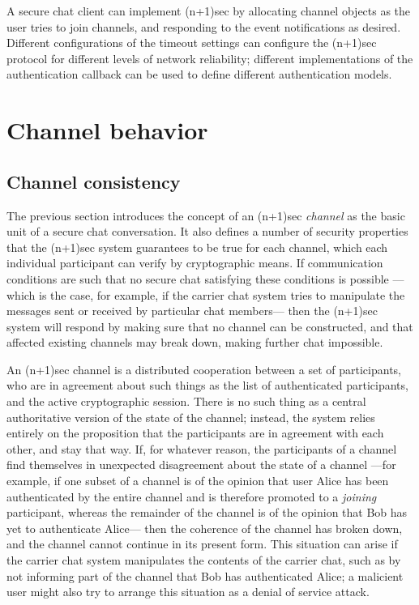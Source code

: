 \documentclass{article}
\begin{document}
A secure chat client can implement (n+1)sec by allocating channel objects as the user tries to join channels, and responding to the event notifications as desired.
Different configurations of the timeout settings can configure the (n+1)sec protocol for different levels of network reliability; different implementations of the authentication callback can be used to define different authentication models.

\section{Channel behavior}
\label{sec:channel-behavior}

\subsection{Channel consistency}
\label{sec:channel-behavior/channel-consistency}
The previous section introduces the concept of an (n+1)sec \emph{channel} as the basic unit of a secure chat conversation.
It also defines a number of security properties that the (n+1)sec system guarantees to be true for each channel, which each individual participant can verify by cryptographic means.
If communication conditions are such that no secure chat satisfying these conditions is possible ---which is the case, for example, if the carrier chat system tries to manipulate the messages sent or received by particular chat members--- then the (n+1)sec system will respond by making sure that no channel can be constructed, and that affected existing channels may break down, making further chat impossible.

An (n+1)sec channel is a distributed cooperation between a set of participants, who are in agreement about such things as the list of authenticated participants, and the active cryptographic session.
There is no such thing as a central authoritative version of the state of the channel; instead, the system relies entirely on the proposition that the participants are in agreement with each other, and stay that way.
If, for whatever reason, the participants of a channel find themselves in unexpected disagreement about the state of a channel ---for example, if one subset of a channel is of the opinion that user Alice has been authenticated by the entire channel and is therefore promoted to a \emph{joining} participant, whereas the remainder of the channel is of the opinion that Bob has yet to authenticate Alice--- then the coherence of the channel has broken down, and the channel cannot continue in its present form.
This situation can arise if the carrier chat system manipulates the contents of the carrier chat, such as by not informing part of the channel that Bob has authenticated Alice; a malicient user might also try to arrange this situation as a denial of service attack.
\end{document}
